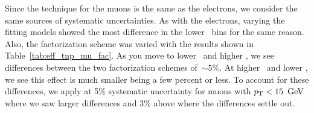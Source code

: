 \begin{table}[hb]
\begin{center}
\caption[Muon efficiencies measured using the \tnp~method]
{\label{tab:eff_tnp_mu}
Muon efficiencies measured using the \tnp~method. The uncertainties are
statistical only.
}
\end{center}
\end{table}

Since the technique for the muons is the same as the electrons, we consider
the same sources of systematic uncertainties. As with the electrons, varying
the fitting models showed the most difference in the lower \pt~bins for the
same reason. Also, the factorization scheme was varied with the results shown
in Table~\ref{tab:eff_tnp_mu_fac}. As you move to lower \pt~and higher \aeta,
we see differences between the two factorization schemes of~$\sim
5\%$. At higher \pt~and lower \aeta, we see this effect is much smaller being
a few percent or less. To account for these differences, we apply at 5\%
systematic uncertainty for muons with $p_{\mathrm{T}}<15\ \,\text{Ge\hspace{-.08em}V}$ where we saw larger
differences and 3\% above where the differences settle out.

